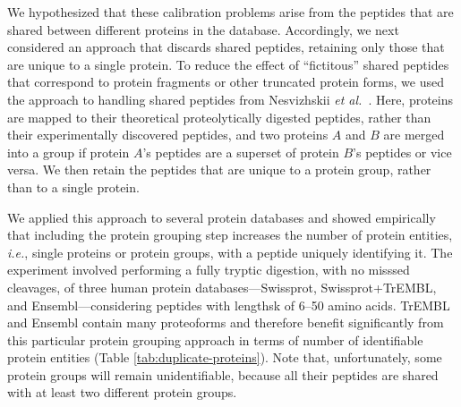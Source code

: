 \documentclass{article}
\begin{document}
We hypothesized that these calibration problems arise from the
peptides that are shared between different proteins in the database.
Accordingly, we next considered an approach that discards shared
peptides, retaining only those that are unique to a single protein.
To reduce the effect of ``fictitous'' shared peptides that correspond
to protein fragments or other truncated protein forms, we used the
approach to handling shared peptides from Nesvizhskii {\em et
  al.}~\cite{nesvizhskii2003statistical}. Here, proteins are mapped to
their theoretical proteolytically digested peptides, rather than their
experimentally discovered peptides, and two proteins $A$ and $B$ are
merged into a group if protein $A$'s peptides are a superset of
protein $B$'s peptides or vice versa.  We then retain the peptides
that are unique to a protein group, rather than to a single protein.

We applied this approach to several protein databases and showed
empirically that including the protein grouping step increases the
number of protein entities, {\em i.e.}, single proteins or protein
groups, with a peptide uniquely identifying it.  The experiment
involved performing a fully tryptic digestion, with no misssed
cleavages, of three human protein databases---Swissprot,
Swissprot+TrEMBL, and Ensembl---considering peptides with lengthsk of
6--50 amino acids. TrEMBL and Ensembl contain many proteoforms and
therefore benefit significantly from this particular protein grouping
approach in terms of number of identifiable protein entities (Table
\ref{tab:duplicate-proteins}). Note that, unfortunately, some protein
groups will remain unidentifiable, because all their peptides are
shared with at least two different protein groups.
\end{document}
